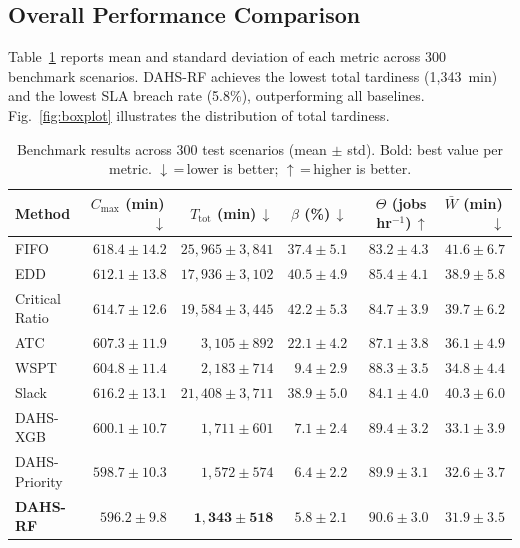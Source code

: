 \documentclass[3p,times]{elsarticle}
\begin{document}
\subsection{Overall Performance Comparison}

Table~\ref{tab:results} reports mean and standard deviation of each
metric across 300 benchmark scenarios.
DAHS-RF achieves the lowest total tardiness (1{,}343~min) and the
lowest SLA breach rate (5.8\%), outperforming all baselines.
Fig.~\ref{fig:boxplot} illustrates the distribution of total
tardiness.

\begin{table}[htbp]
  \centering
  \caption{Benchmark results across 300 test scenarios
    (mean $\pm$ std).  Bold: best value per metric.
    $\downarrow$\,=\,lower is better;
    $\uparrow$\,=\,higher is better.}
  \label{tab:results}
  \renewcommand{\arraystretch}{1.05}
  \begin{tabular}{@{}lrrrrr@{}}
    \toprule
    Method &
      $C_{\max}$ (min)\,$\downarrow$ &
      $T_{\mathrm{tot}}$ (min)\,$\downarrow$ &
      $\beta$ (\%)\,$\downarrow$ &
      $\Theta$ (jobs\,hr$^{-1}$)\,$\uparrow$ &
      $\bar{W}$ (min)\,$\downarrow$ \\
    \midrule
    FIFO
      & $618.4\pm14.2$ & $25{,}965\pm3{,}841$ & $37.4\pm5.1$
      & $83.2\pm4.3$ & $41.6\pm6.7$ \\
    EDD
      & $612.1\pm13.8$ & $17{,}936\pm3{,}102$ & $40.5\pm4.9$
      & $85.4\pm4.1$ & $38.9\pm5.8$ \\
    Critical Ratio
      & $614.7\pm12.6$ & $19{,}584\pm3{,}445$ & $42.2\pm5.3$
      & $84.7\pm3.9$ & $39.7\pm6.2$ \\
    ATC
      & $607.3\pm11.9$ & $3{,}105\pm892$       & $22.1\pm4.2$
      & $87.1\pm3.8$ & $36.1\pm4.9$ \\
    WSPT
      & $604.8\pm11.4$ & $2{,}183\pm714$       & $9.4\pm2.9$
      & $88.3\pm3.5$ & $34.8\pm4.4$ \\
    Slack
      & $616.2\pm13.1$ & $21{,}408\pm3{,}711$ & $38.9\pm5.0$
      & $84.1\pm4.0$ & $40.3\pm6.0$ \\
    DAHS-XGB
      & $600.1\pm10.7$ & $1{,}711\pm601$       & $7.1\pm2.4$
      & $89.4\pm3.2$ & $33.1\pm3.9$ \\
    DAHS-Priority
      & $598.7\pm10.3$ & $1{,}572\pm574$       & $6.4\pm2.2$
      & $89.9\pm3.1$ & $32.6\pm3.7$ \\
    \textbf{DAHS-RF}
      & $\bm{596.2\pm9.8}$
      & $\bm{1{,}343\pm518}$
      & $\bm{5.8\pm2.1}$
      & $\bm{90.6\pm3.0}$
      & $\bm{31.9\pm3.5}$ \\
    \bottomrule
  \end{tabular}
\end{table}
\end{document}

